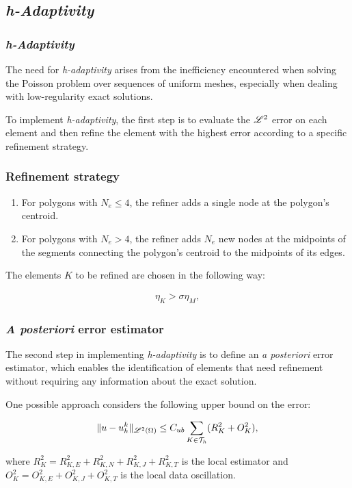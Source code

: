\subsection{\textit{h-Adaptivity}}

\begin{frame}
    \frametitle{\textit{h-Adaptivity}}

    The need for \textit{h-adaptivity} arises from the inefficiency encountered when solving the Poisson problem over sequences of uniform meshes, especially when dealing with low-regularity exact solutions.

    To implement \textit{h-adaptivity}, the first step is to evaluate the $\mathscr{L}^2$ error on each element and then refine the element with the highest error according to a specific refinement strategy.    

\end{frame}

\begin{frame}
    \frametitle{Refinement strategy}

    \begin{enumerate}
        \item For polygons with $N_e \leq 4$, the refiner adds a single node at the polygon's centroid.
        \item For polygons with $N_e > 4$, the refiner adds $N_e$ new nodes at the midpoints of the segments connecting the polygon's centroid to the midpoints of its edges.
    \end{enumerate}

    The elements $K$ to be refined are chosen in the following way:

    \begin{gather}
        \eta_K > \sigma \eta_{M},
    \end{gather}

\end{frame}

\begin{frame}
    \frametitle{\textit{A posteriori} error estimator}

    The second step in implementing \textit{h-adaptivity} is to define an \textit{a posteriori} error estimator, which enables the identification of elements that need refinement without requiring any information about the exact solution.

    One possible approach considers the following upper bound on the error:

    \begin{gather}
        \lVert u - u^k_h \rVert_{\mathscr{L}^2(\Omega)} \leq C_{ub} \sum_{K \in \mathcal{T}_h} (R_K^2 + O_K^2),
    \end{gather}

    where $R_K^2 = R_{K, E}^2 + R_{K, N}^2 + R_{K, J}^2 + R_{K, T}^2$ is the local estimator and $O_K^2 = O_{K, E}^2 + O_{K, J}^2 + O_{K, T}^2$ is the local data oscillation.

\end{frame}

